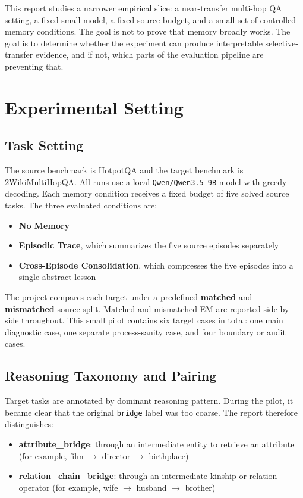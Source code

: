 \documentclass[11pt]{article}
\begin{document}
This report studies a narrower empirical slice: a near-transfer multi-hop QA setting, a fixed small model, a fixed source budget, and a small set of controlled memory conditions. The goal is not to prove that memory broadly works. The goal is to determine whether the experiment can produce interpretable selective-transfer evidence, and if not, which parts of the evaluation pipeline are preventing that.

\section{Experimental Setting}

\subsection{Task Setting}

The source benchmark is HotpotQA and the target benchmark is 2WikiMultiHopQA. All runs use a local \texttt{Qwen/Qwen3.5-9B} model with greedy decoding. Each memory condition receives a fixed budget of five solved source tasks. The three evaluated conditions are:

\begin{itemize}
\item \textbf{No Memory}
\item \textbf{Episodic Trace}, which summarizes the five source episodes separately
\item \textbf{Cross-Episode Consolidation}, which compresses the five episodes into a single abstract lesson
\end{itemize}

The project compares each target under a predefined \textbf{matched} and \textbf{mismatched} source split. Matched and mismatched EM are reported side by side throughout. This small pilot contains six target cases in total: one main diagnostic case, one separate process-sanity case, and four boundary or audit cases.

\subsection{Reasoning Taxonomy and Pairing}

Target tasks are annotated by dominant reasoning pattern. During the pilot, it became clear that the original \texttt{bridge} label was too coarse. The report therefore distinguishes:

\begin{itemize}
\item \textbf{attribute\_bridge}: through an intermediate entity to retrieve an attribute (for example, film $\rightarrow$ director $\rightarrow$ birthplace)
\item \textbf{relation\_chain\_bridge}: through an intermediate kinship or relation operator (for example, wife $\rightarrow$ husband $\rightarrow$ brother)
\end{itemize}
\end{document}
